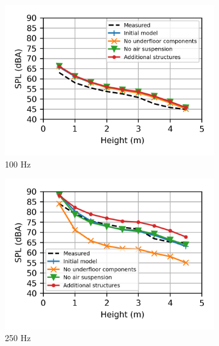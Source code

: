 \begin{figure}[H]
	\centering
	\begin{subfigure}[b]{0.49\textwidth}
		\centering
		\includegraphics{fig/chap5/geometry_variation/third_octave_over_height/100_Hz.png}
		\caption{100 Hz}
	\end{subfigure}
	\hfill
	\begin{subfigure}[b]{0.49\textwidth}
		\centering
		\includegraphics{fig/chap5/geometry_variation/third_octave_over_height/250_Hz.png}
		\caption{250 Hz}
	\end{subfigure}
	\\
	\begin{subfigure}[b]{0.49\textwidth}
		\centering

\end{subfigure}
\end{figure}
